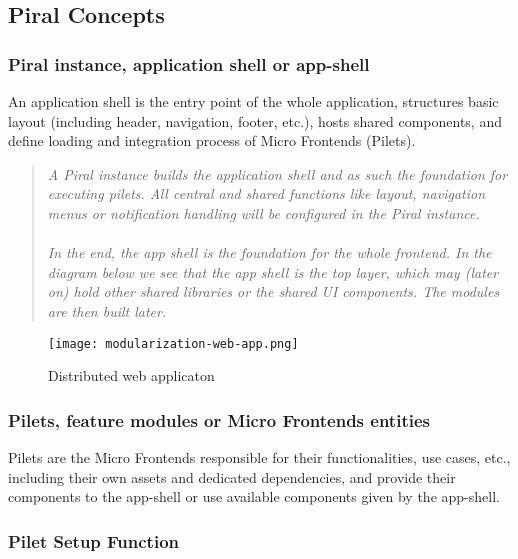 \documentclass[a4paper]{book}
\begin{document}
\subsection{Piral Concepts}
\subsubsection{Piral instance, application shell or app-shell}

An application shell is the entry point of the whole application, structures basic layout (including header, navigation, footer, etc.), hosts shared components, and define loading and integration process of Micro Frontends (Pilets).

\begin{quote}
    \textit{A Piral instance builds the application shell and as such the foundation for executing pilets. All central and shared functions like layout, navigation menus or notification handling will be configured in the Piral instance.
\\ \\ 
In the end, the app shell is the foundation for the whole frontend. In the diagram below we see that the app shell is the top layer, which may (later on) hold other shared libraries or the shared UI components. The modules are then built later.} \cite{PiralGettingStarted}
\end{quote}

\begin{figure}[h!]
  \centering
  \captionsetup{justification=centering}
  \texttt{[image: modularization-web-app.png]}
  \caption{Distributed web applicaton \cite{PiralGettingStarted}}
  \label{fig:7}
\end{figure}

\subsubsection{Pilets, feature modules or Micro Frontends entities}

Pilets are the Micro Frontends responsible for their functionalities, use cases, etc., including their own assets and dedicated dependencies, and provide their components to the app-shell or use available components given by the app-shell.

\subsubsection{Pilet Setup Function}
\end{document}
